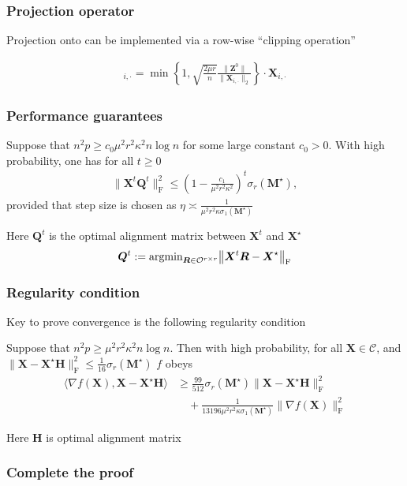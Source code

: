 \documentclass[compress,
mathserif,wide,%
]{beamer}
\begin{document}
\begin{frame}
	\frametitle{Projection operator}
	Projection onto can be implemented via a row-wise ``clipping operation''
	
	\begin{align*}
		[\mathcal{P}_{\mathcal{C}} ( \bm{X} ) ]_{i,\cdot} = \min \left \{ 1,  \sqrt{ \frac{2 \mu r}{n} } \frac{\|\bm{Z}^0\|}{ \|\bm{X}_{i,\cdot}\|_2} \right \} \cdot \bm{X}_{i, \cdot}
	\end{align*}
	
\end{frame}


\begin{frame}
	\frametitle{Performance guarantees}
	\begin{theorem}
		Suppose that $n^2 p \geq c_0 \mu^2 r^2 \kappa^2 n \log n$ for some large constant $c_0 > 0$. With high probability, one has for all $t \geq 0$
		\begin{align*}
			\|\bm{X}^t \bm{Q}^t \|_{\mathrm{F}}^2 \leq \left ( 1 - \frac{c_1}{\mu^2 r^2 \kappa^2}\right)^{t} \sigma_{r} (\bm{M}^\star),
		\end{align*}
		provided that step size is chosen as $\eta \asymp \frac{1}{\mu^2 r^2 \kappa \sigma_1(\bm{M}^\star)}$
	\end{theorem}
	Here $\bm{Q}^t$ is the optimal alignment matrix between $\bm{X}^t$ and $\bm{X}^\star$
	\[
\bm{Q}^{t}:=\mbox{argmin}_{\bm{R}\in\mathcal{O}^{r\times r}}\big\Vert \bm{X}^{t}\bm{R}-\bm{X}^{\star}\big\Vert _{\mathrm{F}}
\]
\end{frame}
 




\begin{frame}
	\frametitle{Regularity condition}
	Key to prove convergence is the following regularity condition
	
	\vfill
	\begin{lemma}
		Suppose that $n^2 p \geq \mu^2 r^2 \kappa^2 n \log n$. Then with high probability, for all $\bm{X} \in \mathcal{C}$, and $\|\bm{X} - \bm{X}^\star \bm{H}\|_{\mathrm{F}}^2 \leq \frac{1}{16}\sigma_r(\bm{M}^\star)$ $f$ obeys
		\begin{align*}
		\langle \nabla f (\bm{X}), \bm{X} - \bm{X}^\star \bm{H} \rangle &\geq \frac{99}{512}\sigma_{r}(\bm{M}^\star) \| \bm{X} - \bm{X}^\star \bm{H} \|_{\mathrm{F}}^2 \\
		&\quad + \frac{1}{13196 \mu^2 r^2 \kappa \sigma_{1}( \bm{M}^\star)} \| \nabla f (\bm{X}) \|_{\mathrm{F}}^2
		\end{align*}
	\end{lemma}
	
	Here $\bm{H}$ is optimal alignment matrix 
\end{frame}

\begin{frame}
	\frametitle{Complete the proof}
\end{frame}
 
\end{document}
